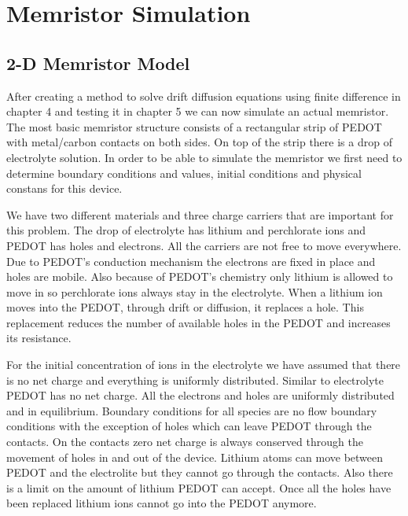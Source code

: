 
\chapter{Memristor Simulation} %

\label{Chapter6} %


\section{2-D Memristor Model}


After creating a method to solve drift diffusion equations using finite difference in chapter 4 and testing it in chapter 5 we can now simulate an actual memristor. The most basic memristor structure consists of a rectangular strip of PEDOT with metal/carbon contacts on both sides. On top of the strip there is a drop of electrolyte solution. In order to be able to simulate the memristor we first need to determine boundary conditions and values, initial conditions and physical constans for this device.

We have two different materials and three charge carriers that are important for this problem. The drop of electrolyte has lithium and perchlorate ions and PEDOT has holes and electrons. All the carriers are not free to move everywhere. Due to PEDOT's conduction mechanism the electrons are fixed in place and holes are mobile. Also because of PEDOT's chemistry only lithium is allowed to move in so perchlorate ions always stay in the electrolyte. When a lithium ion moves into the PEDOT, through drift or diffusion, it replaces a hole. This replacement reduces the number of available holes in the PEDOT and increases its resistance. 

For the initial concentration of ions in the electrolyte we have assumed that there is no net charge and everything is uniformly distributed. Similar to electrolyte PEDOT has no net charge. All the electrons and holes are uniformly distributed and in equilibrium. Boundary conditions for all species are no flow boundary conditions with the exception of holes which can leave PEDOT through the contacts. On the contacts zero net charge is always conserved through the movement of holes in and out of the device. Lithium atoms can move between PEDOT and the electrolite but they cannot go through the contacts. Also there is a limit on the amount of lithium PEDOT can accept. Once all the holes have been replaced lithium ions cannot go into the PEDOT anymore.

